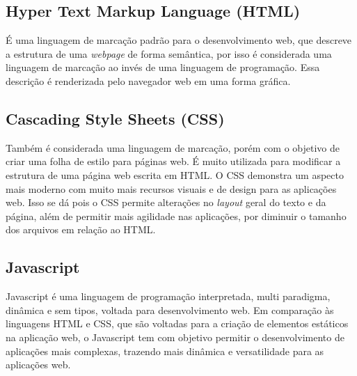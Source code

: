 \documentclass[../../layout.tex]{subfiles}
\begin{document}
\subsection{Hyper Text Markup Language (HTML)}
\hspace*{3em}É uma linguagem de marcação padrão para o desenvolvimento web, que descreve a estrutura de uma \emph{webpage} de forma semântica, por isso é considerada uma linguagem de marcação ao invés de uma linguagem de programação. Essa descrição é renderizada pelo navegador web em uma forma gráfica.\cite{frontend}

\subsection{Cascading Style Sheets (CSS)}
\hspace*{3em}Também é considerada uma linguagem de marcação, porém com o objetivo de criar uma folha de estilo para páginas web. É muito utilizada para modificar a estrutura de uma página web escrita em HTML. O CSS demonstra um aspecto mais moderno com muito mais recursos visuais e de design para as aplicações web. Isso se dá pois o CSS permite alterações no \emph{layout} geral do texto e da página, além de permitir mais agilidade nas aplicações, por diminuir o tamanho dos arquivos em relação ao HTML.\cite{frontend}

\subsection{Javascript}
\hspace*{3em}Javascript é uma linguagem de programação interpretada, multi paradigma, dinâmica e sem tipos, voltada para desenvolvimento web. Em comparação às linguagens HTML e CSS, que são voltadas para a criação de elementos estáticos na aplicação web, o Javascript tem com objetivo permitir o desenvolvimento de aplicações mais complexas, trazendo mais dinâmica e versatilidade para as aplicações web.\cite{frontend}
\end{document}
